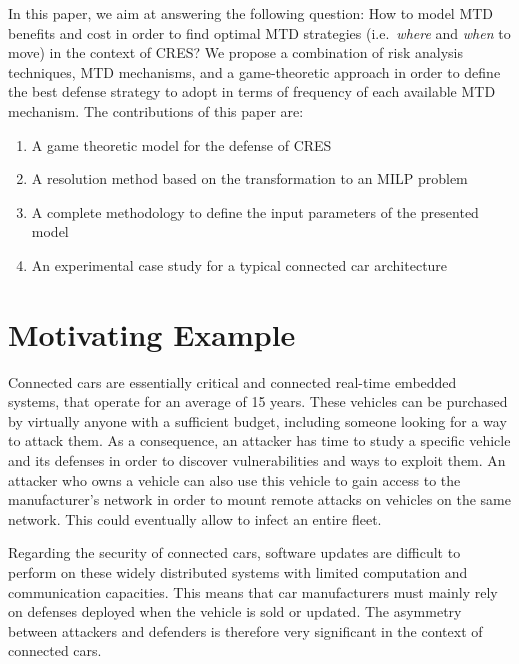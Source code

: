 In this paper, we aim at answering the following question: How to model MTD benefits and cost in order to find optimal MTD strategies (i.e.~\emph{where} and \emph{when} to move) in the context of CRES? We propose a combination of risk analysis techniques, MTD mechanisms, and a game-theoretic approach in order to define the best defense strategy to adopt in terms of frequency of each available MTD mechanism. 
The contributions of this paper are: 
\begin{enumerate}
    \item A game theoretic model for the defense of CRES
    \item A resolution method based on the transformation to an MILP problem
    \item A complete methodology to define the input parameters of the presented model
    \item An experimental case study for a typical connected car architecture
\end{enumerate}


\section {Motivating Example }

{\huge C}onnected cars are essentially critical and connected real-time embedded systems, that operate for an average of 15 years. 
These vehicles can be purchased by virtually anyone with a sufficient budget, including someone looking for a way to attack them. As a consequence, an attacker has time to study a specific vehicle and its defenses in order to discover vulnerabilities and ways to exploit them. 
An attacker who owns a vehicle can also use this vehicle to gain access to the manufacturer's network in order to mount remote attacks on vehicles on the same network. This could eventually allow to infect an entire fleet.

Regarding the security of connected cars, software updates are difficult to perform on these widely distributed systems with limited computation and communication capacities.
This means that car manufacturers must mainly rely on defenses deployed when the vehicle is sold or updated. 
The asymmetry between attackers and defenders is therefore very significant in the context of connected cars. 

